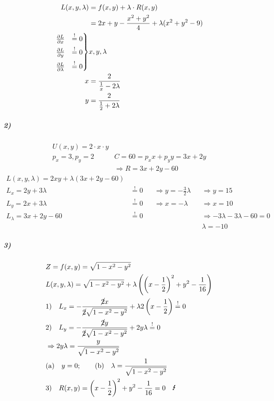 \begin{align*}
    L(x, y, \lambda) &= f(x, y) + \lambda \cdot R(x, y) \\
    &= 2x + y - \frac{x^2 + y^2}{4} + \lambda(x^2 + y^2 - 9) \\
    \begin{rcases}
        \frac{\partial L}{\partial x} &\overset{!}{=} 0 \\
        \frac{\partial L}{\partial y} &\overset{!}{=} 0 \\
        \frac{\partial L}{\partial \lambda} &\overset{!}{=} 0
    \end{rcases}
    &x, y, \lambda \\
    x &= \frac{2}{\frac{1}{x} - 2 \lambda} \\
    y &= \frac{2}{\frac{1}{2} + 2 \lambda}
\end{align*}

\subparagraph{2)}

\begin{align*}
    U(x, y) = 2 \cdot x \cdot y \\
    p_x = 3, p_y = 2 \qquad &C = 60 = p_x x + p_y y = 3x + 2y \\
    &\Rightarrow R = 3x + 2y - 60
\end{align*}
\begin{align*}
    L(x, y, \lambda) = 2xy + \lambda (3x + 2y - 60) \\
    L_x = 2 y + 3 \lambda &\overset{!}{=} 0 &&\Rightarrow y = - \frac{3}{2} \lambda &&\Rightarrow y = 15 \\
    L_y = 2 x + 3 \lambda &\overset{!}{=} 0 &&\Rightarrow x = - \lambda  &&\Rightarrow x = 10 \\
    L_\lambda = 3 x + 2 y - 60 &\overset{!}{=} 0 && &&\Rightarrow - 3 \lambda - 3 \lambda - 60 = 0 \\
    & && &&\lambda = -10
\end{align*}


\subparagraph{3)}

\begin{align*}
    & Z = f(x, y) = \sqrt{1 - x^2 - y^2} \\
    & L(x, y, \lambda) = \sqrt{1 - x^2 - y^2} + \lambda \left( \left( x - \frac{1}{2} \right)^2 + y^2 - \frac{1}{16} \right) \\
    &1)\quad L_x = - \frac{\cancel{2} x}{\cancel{2} \sqrt{1 - x^2 - y^2}} + \lambda 2 \left( x - \frac{1}{2} \right) \overset{!}{=} 0 \\
    &2)\quad L_y = - \frac{\cancel{2} y}{\cancel{2} \sqrt{1 - x^2 - y^2}} + 2 y \lambda \overset{!}{=} 0 \\
    & \Rightarrow 2 y \lambda = \frac{y}{\sqrt{1 - x^2 - y^2}} \\
    & \text{(a)} \quad y = 0;\qquad \text{(b)} \quad \lambda = \frac{1}{\sqrt{1 - x^2 - y^2}} \\
    &3)\quad R(x, y) = \left( x - \frac{1}{2} \right)^2 + y^2 - \frac{1}{16} = 0 \quad \text{\Lightning}
\end{align*}

